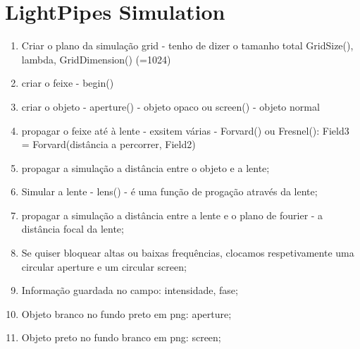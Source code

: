 \documentclass{article}
\begin{document}
\begin{center}
\end{center}

\newpage 

\section*{LightPipes Simulation}


\begin{enumerate}
  \item Criar o plano da simulação grid - tenho de dizer o tamanho total GridSize(), lambda, GridDimension() (=1024)
  \item criar o feixe - begin()
  \item criar o objeto - aperture() - objeto opaco ou screen() - objeto normal
  \item propagar o feixe até à lente - exsitem várias - Forvard() ou Fresnel(): Field3 = Forvard(distância  a percorrer, Field2)
  \item propagar a simulação a distância entre o objeto e a lente;
  \item Simular a lente - lens() - é uma função de progação através da lente;
  \item propagar a simulação a distância entre a lente e o plano de fourier - a distância focal da lente;
  \item Se quiser bloquear altas ou baixas frequências, clocamos respetivamente uma circular aperture e um circular screen;
  \item Informação guardada no campo: intensidade, fase;
  \item Objeto branco no fundo preto em png: aperture;
  \item Objeto preto no fundo branco em png: screen;
\end{enumerate}

\end{document}
